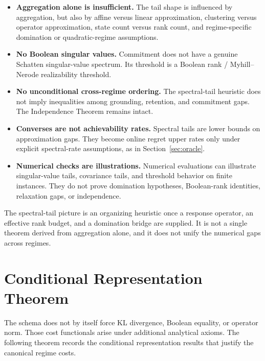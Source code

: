 \documentclass[12pt]{article}
\theoremstyle{definition}
\begin{document}
\begin{itemize}[leftmargin=1.6em]
\item \textbf{Aggregation alone is insufficient.}
The tail shape is influenced by aggregation, but also by affine versus linear
approximation, clustering versus operator approximation, state count versus
rank count, and regime-specific domination or quadratic-regime assumptions.

\item \textbf{No Boolean singular values.}
Commitment does not have a genuine Schatten singular-value spectrum.  Its
threshold is a Boolean rank / Myhill--Nerode realizability threshold.

\item \textbf{No unconditional cross-regime ordering.}
The spectral-tail heuristic does not imply inequalities among grounding,
retention, and commitment gaps.  The Independence Theorem remains intact.

\item \textbf{Converses are not achievability rates.}
Spectral tails are lower bounds on approximation gaps.  They become online
regret upper rates only under explicit spectral-rate assumptions, as in
Section~\ref{sec:oracle}.

\item \textbf{Numerical checks are illustrations.}
Numerical evaluations can illustrate singular-value tails, covariance tails,
and threshold behavior on finite instances.  They do not prove domination
hypotheses, Boolean-rank identities, relaxation gaps, or independence.
\end{itemize}

The spectral-tail picture is an organizing heuristic once a response operator,
an effective rank budget, and a domination bridge are supplied.  It is not a
single theorem derived from aggregation alone, and it does not unify the
numerical gaps across regimes.

\section{Conditional Representation Theorem}
\label{sec:conditional-rep}

The schema does not by itself force KL divergence, Boolean equality, or
operator norm.  Those cost functionals arise under additional analytical
axioms.  The following theorem records the conditional representation results
that justify the canonical regime costs.
\end{document}
